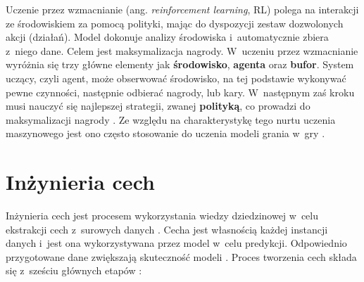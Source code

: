 Uczenie przez wzmacnianie (ang. \textit{reinforcement learning}, RL) polega na interakcji ze środowiskiem za pomocą polityki, mając do dyspozycji zestaw dozwolonych akcji (działań). Model dokonuje analizy środowiska i~automatycznie zbiera z~niego dane. Celem jest maksymalizacja nagrody. W~uczeniu przez wzmacnianie wyróżnia się trzy główne elementy jak \textbf{środowisko}, \textbf{agenta} oraz \textbf{bufor}. System uczący, czyli agent, może obserwować środowisko, na tej podstawie wykonywać pewne czynności, następnie odbierać nagrody, lub kary. W~następnym zaś kroku musi nauczyć się najlepszej strategii, zwanej \textbf{polityką}, co prowadzi do maksymalizacji nagrody \cite{Sawka18}. Ze względu na charakterystykę tego nurtu uczenia maszynowego jest ono często stosowanie do uczenia modeli grania w~gry \cite{Sawka20}.

\section{Inżynieria cech}
\label{cha:cha3.3}

Inżynieria cech jest procesem wykorzystania wiedzy dziedzinowej w~celu ekstrakcji cech z~surowych danych \cite{Ng}. Cecha jest własnością każdej instancji danych i~jest ona wykorzystywana przez model w~celu predykcji. Odpowiednio przygotowane dane zwiększają skuteczność modeli \cite{Ng}. Proces tworzenia cech składa się z~sześciu głównych etapów \cite{ColumbiaLearn}:

